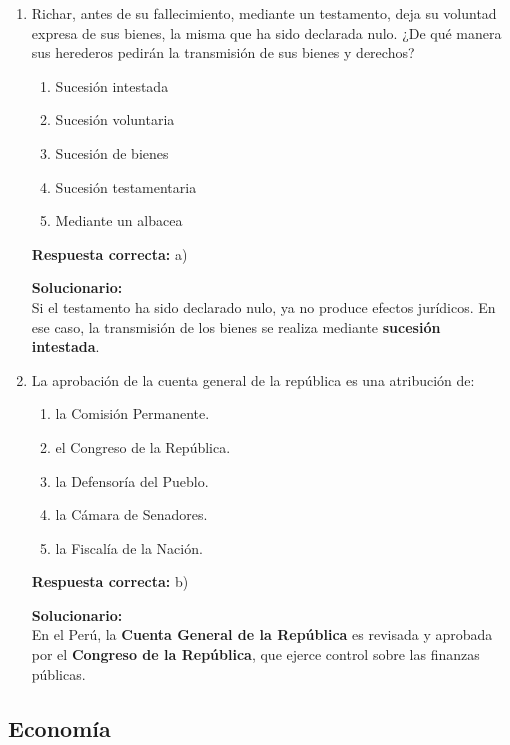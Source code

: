 \begin{enumerate}
	\item Richar, antes de su fallecimiento, mediante un testamento, deja su voluntad expresa de sus bienes, la misma que ha sido declarada nulo. ¿De qué manera sus herederos pedirán la transmisión de sus bienes y derechos?
	\begin{enumerate}[label=\alph*)]
		\item Sucesión intestada
		\item Sucesión voluntaria
		\item Sucesión de bienes
		\item Sucesión testamentaria
		\item Mediante un albacea
	\end{enumerate}
	\textbf{Respuesta correcta:} a)
	
	\vspace{2mm}
	\textbf{Solucionario:}\\
	Si el testamento ha sido declarado nulo, ya no produce efectos jurídicos. En ese caso, la transmisión de los bienes se realiza mediante \textbf{sucesión intestada}.
	
	\vspace{6mm}
	
	\item La aprobación de la cuenta general de la república es una atribución de:
	\begin{enumerate}[label=\alph*)]
		\item la Comisión Permanente.
		\item el Congreso de la República.
		\item la Defensoría del Pueblo.
		\item la Cámara de Senadores.
		\item la Fiscalía de la Nación.
	\end{enumerate}
	\textbf{Respuesta correcta:} b)
	
	\vspace{2mm}
	\textbf{Solucionario:}\\
	En el Perú, la \textbf{Cuenta General de la República} es revisada y aprobada por el \textbf{Congreso de la República}, que ejerce control sobre las finanzas públicas.
	
	\vspace{6mm}
	
\end{enumerate}

\subsection*{Economía}

